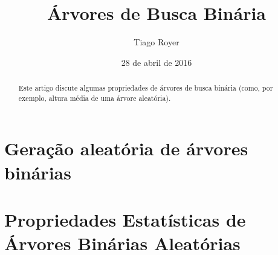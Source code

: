 \documentclass{article}
\theoremstyle{definition}
\theoremstyle{remark}
\begin{document}
\title{Árvores de Busca Binária}
\author{Tiago Royer}
\date{28 de abril de 2016}
\maketitle

\begin{abstract}
    Este artigo discute algumas propriedades de árvores de busca binária
    (como, por exemplo, altura média de uma árvore aleatória).
\end{abstract}



\section{Geração aleatória de árvores binárias}




\section{Propriedades Estatísticas de Árvores Binárias Aleatórias}







\end{document}
